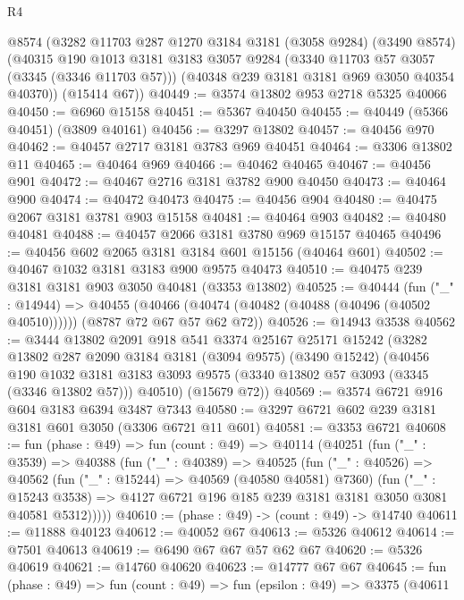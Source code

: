 \begin{lexlean}{R4}
\begin{coremodule}
    @8574
    (@3282
      @11703
      @287
      @1270
      @3184
      @3181
      (@3058 @9284)
      (@3490 @8574)
      (@40315
        @190
        @1013
        @3181
        @3183
        @3057
        @9284
        (@3340 @11703 @57 @3057 (@3345 (@3346 @11703 @57)))
        (@40348 @239 @3181 @3181 @969 @3050 @40354 @40370))
      (@15414 @67))
@40449 := @3574 @13802 @953 @2718 @5325 @40066
@40450 := @6960 @15158
@40451 := @5367 @40450
@40455 := @40449 (@5366 @40451) (@3809 @40161)
@40456 := @3297 @13802
@40457 := @40456 @970
@40462 := @40457 @2717 @3181 @3783 @969 @40451
@40464 := @3306 @13802 @11
@40465 := @40464 @969
@40466 := @40462 @40465
@40467 := @40456 @901
@40472 := @40467 @2716 @3181 @3782 @900 @40450
@40473 := @40464 @900
@40474 := @40472 @40473
@40475 := @40456 @904
@40480 := @40475 @2067 @3181 @3781 @903 @15158
@40481 := @40464 @903
@40482 := @40480 @40481
@40488 := @40457 @2066 @3181 @3780 @969 @15157 @40465
@40496 := @40456 @602 @2065 @3181 @3184 @601 @15156 (@40464 @601)
@40502 := @40467 @1032 @3181 @3183 @900 @9575 @40473
@40510 := @40475 @239 @3181 @3181 @903 @3050 @40481 (@3353 @13802)
@40525 := @40444
    (fun ("_" : @14944) =>
    @40455 (@40466 (@40474 (@40482 (@40488 (@40496 (@40502 @40510)))))) (@8787 @72 @67 @57 @62 @72))
@40526 := @14943 @3538
@40562 := @3444
    @13802
    @2091
    @918
    @541
    @3374
    @25167
    @25171
    @15242
    (@3282
      @13802
      @287
      @2090
      @3184
      @3181
      (@3094 @9575)
      (@3490 @15242)
      (@40456
        @190
        @1032
        @3181
        @3183
        @3093
        @9575
        (@3340 @13802 @57 @3093 (@3345 (@3346 @13802 @57)))
        @40510)
      (@15679 @72))
@40569 := @3574 @6721 @916 @604 @3183 @6394 @3487 @7343
@40580 := @3297 @6721 @602 @239 @3181 @3181 @601 @3050 (@3306 @6721 @11 @601)
@40581 := @3353 @6721
@40608 := fun (phase : @49) =>
  fun (count : @49) =>
  @40114
    (@40251
      (fun ("_" : @3539) =>
      @40388
        (fun ("_" : @40389) =>
        @40525
          (fun ("_" : @40526) =>
          @40562
            (fun ("_" : @15244) => @40569 (@40580 @40581) @7360)
            (fun ("_" : @15243 @3538) =>
            @4127 @6721 @196 @185 @239 @3181 @3181 @3050 @3081 @40581 @5312)))))
@40610 := (phase : @49) -> (count : @49) -> @14740
@40611 := @11888 @40123
@40612 := @40052 @67
@40613 := @5326 @40612
@40614 := @7501 @40613
@40619 := @6490 @67 @67 @57 @62 @67
@40620 := @5326 @40619
@40621 := @14760 @40620
@40623 := @14777 @67 @67
@40645 := fun (phase : @49) =>
  fun (count : @49) =>
  fun (epsilon : @49) =>
  @3375
    (@40611

\end{coremodule}
\end{lexlean}
